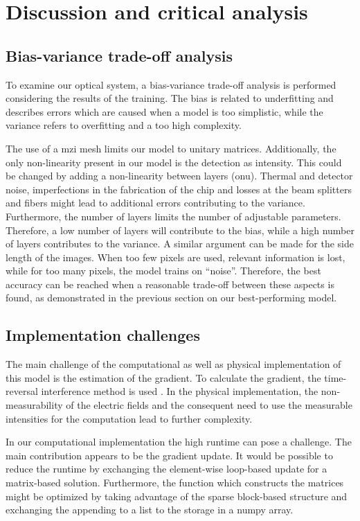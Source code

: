 \section{Discussion and critical analysis} %
\subsection{Bias-variance trade-off analysis}
To examine our optical system, a bias-variance trade-off analysis is performed considering the results of the training.
The bias is related to underfitting and describes errors which are caused when a model is too simplistic, while the variance refers to overfitting and a too high complexity.

The use of a \gls{mzi} mesh limits our model to unitary matrices. 
Additionally, the only non-linearity present in our model is the detection as intensity. This could be changed by adding a non-linearity between layers (\gls{onu}).
Thermal and detector noise, imperfections in the fabrication of the chip and losses at the beam splitters and fibers might lead to additional errors contributing to the variance.
Furthermore, the number of layers limits the number of adjustable parameters. Therefore, a low number of layers will contribute to the bias, while a high number of layers contributes to the variance.
A similar argument can be made for the side length of the images. When too few pixels are used, relevant information is lost, while for too many pixels, the model trains on ``noise''. Therefore, the best accuracy can be reached when a reasonable trade-off between these aspects is found, as demonstrated in the previous section on our best-performing model.

\subsection{Implementation challenges}
The main challenge of the computational as well as physical implementation of this model is the estimation of the gradient. %
To calculate the gradient, the time-reversal interference method is used \cite{hughesTrainingPhotonicNeural2018}.
In the physical implementation, the non-measurability of the electric fields and the consequent need to use the measurable intensities for the computation lead to further complexity.

In our computational implementation the high runtime can pose a challenge. The main contribution appears to be the gradient update.
It would be possible to reduce the runtime by exchanging the element-wise loop-based update for a matrix-based solution.
Furthermore, the function  which constructs the matrices might be optimized by taking advantage of the sparse block-based structure and exchanging the appending to a list to the storage in a numpy array.

